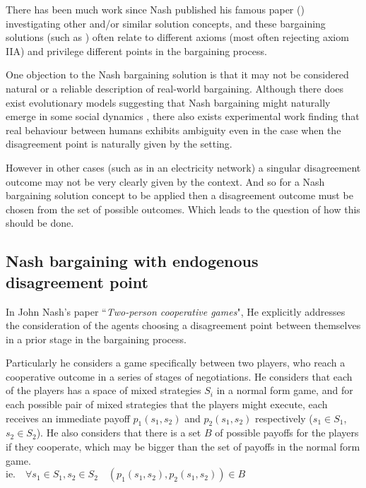 There has been much work since Nash published his famous paper (\cite{nash1}) investigating other and/or similar solution concepts, and these bargaining solutions (such as \cite{smorodinsky,tempered,tale1,anbarci2002comparing}) often relate to different axioms (most often rejecting axiom IIA) and privilege different points in the bargaining process.

One objection to the Nash bargaining solution is that it may not be considered natural or a reliable description of real-world bargaining.
Although there does exist evolutionary models suggesting that Nash bargaining might naturally emerge in some social dynamics \cite{articlechoakihiko}, there also exists experimental work finding that real behaviour between humans exhibits ambiguity even in the case when the disagreement point is naturally given by the setting.\cite{KROLL2014261}

However in other cases (such as in an electricity network) a singular disagreement outcome may not be very clearly given by the context.
And so for a Nash bargaining solution concept to be applied then a disagreement outcome must be chosen from the set of possible outcomes.
Which leads to the question of how this should be done.

\subsection{Nash bargaining with endogenous disagreement point}\label{subsec:nash_bargaining_endogenous}

In John Nash's paper ``\textit{Two-person cooperative games}"\cite{nash2}, He explicitly addresses the consideration of the agents choosing a disagreement point between themselves in a prior stage in the bargaining process.

Particularly he considers a game specifically between two players, who reach a cooperative outcome in a series of stages of negotiations.
He considers that each of the players has a space of mixed strategies $S_i$ in a normal form game, and for each possible pair of mixed strategies that the players might execute, each receives an immediate payoff $p_1(s_1,s_2)$ and $p_2(s_1,s_2)$ respectively ($s_1\in S_1$, $s_2\in S_2$).
He also considers that there is a set $B$ of possible payoffs for the players if they cooperate, which may be bigger than the set of payoffs in the normal form game.\\
$\text{ie.}\quad \forall s_1\in S_1,s_2\in S_2 \quad (p_1(s_1,s_2), p_2(s_1,s_2)) \in B$

